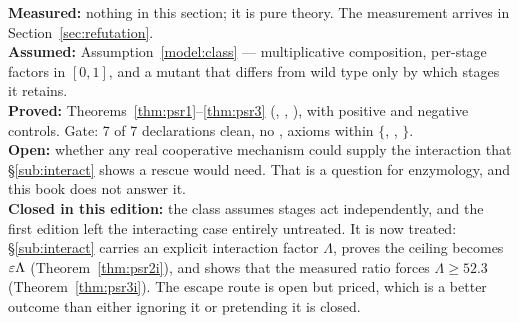 \begin{ledger}
\textbf{Measured:} nothing in this section; it is pure theory. The measurement
arrives in Section~\ref{sec:refutation}. \\
\textbf{Assumed:} Assumption~\ref{model:class} --- multiplicative composition,
per-stage factors in $[0,1]$, and a mutant that differs from wild type only by
which stages it retains. \\
\textbf{Proved:} Theorems~\ref{thm:psr1}--\ref{thm:psr3}
(, ,
), with positive
and negative controls. Gate: 7 of 7 declarations clean, no ,
axioms within $\{$, , $\}$. \\
\textbf{Open:} whether any real cooperative mechanism could supply the
interaction that \S\ref{sub:interact} shows a rescue would need. That is a
question for enzymology, and this book does not answer it. \\
\textbf{Closed in this edition:} the class assumes stages act independently, and
the first edition left the interacting case entirely untreated. It is now
treated: \S\ref{sub:interact} carries an explicit interaction factor $\Lambda$,
proves the ceiling becomes $\varepsilon\Lambda$ (Theorem~\ref{thm:psr2i}), and shows
that the measured ratio forces $\Lambda \ge 52.3$
(Theorem~\ref{thm:psr3i}). The escape route is open but priced, which is a
better outcome than either ignoring it or pretending it is closed.
\end{ledger}
